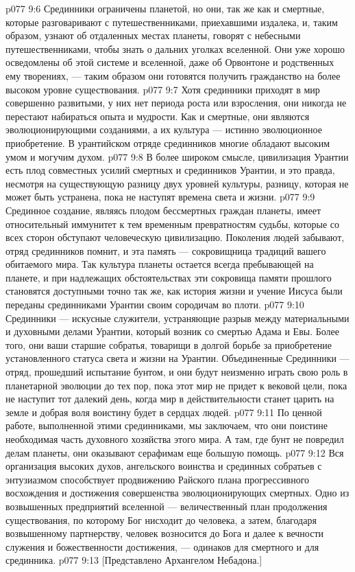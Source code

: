 \vs p077 9:6 \pc Срединники ограничены планетой, но они, так же как и смертные, которые разговаривают с путешественниками, приехавшими издалека, и, таким образом, узнают об отдаленных местах планеты, говорят с небесными путешественниками, чтобы знать о дальних уголках вселенной. Они уже хорошо осведомлены об этой системе и вселенной, даже об Орвонтоне и родственных ему творениях, --- таким образом они готовятся получить гражданство на более высоком уровне существования.
\vs p077 9:7 Хотя срединники приходят в мир совершенно развитыми, у них нет периода роста или взросления, они никогда не перестают набираться опыта и мудрости. Как и смертные, они являются эволюционирующими созданиями, а их культура --- истинно эволюционное приобретение. В урантийском отряде срединников многие обладают высоким умом и могучим духом.
\vs p077 9:8 В более широком смысле, цивилизация Урантии есть плод совместных усилий смертных и срединников Урантии, и это правда, несмотря на существующую разницу двух уровней культуры, разницу, которая не может быть устранена, пока не наступят времена света и жизни.
\vs p077 9:9 Срединное создание, являясь плодом бессмертных граждан планеты, имеет относительный иммунитет к тем временным превратностям судьбы, которые со всех сторон обступают человеческую цивилизацию. Поколения людей забывают, отряд срединников помнит, и эта память --- сокровищница традиций вашего обитаемого мира. Так культура планеты остается всегда пребывающей на планете, и при надлежащих обстоятельствах эти сокровища памяти прошлого становятся доступными точно так же, как история жизни и учение Иисуса были переданы срединниками Урантии своим сородичам во плоти.
\vs p077 9:10 Срединники --- искусные служители, устраняющие разрыв между материальными и духовными делами Урантии, который возник со смертью Адама и Евы. Более того, они ваши старшие собратья, товарищи в долгой борьбе за приобретение установленного статуса света и жизни на Урантии. Объединенные Срединники --- отряд, прошедший испытание бунтом, и они будут неизменно играть свою роль в планетарной эволюции до тех пор, пока этот мир не придет к вековой цели, пока не наступит тот далекий день, когда мир в действительности станет царить на земле и добрая воля воистину будет в сердцах людей.
\vs p077 9:11 По ценной работе, выполненной этими срединниками, мы заключаем, что они поистине необходимая часть духовного хозяйства этого мира. А там, где бунт не повредил делам планеты, они оказывают серафимам еще большую помощь.
\vs p077 9:12 \pc Вся организация высоких духов, ангельского воинства и срединных собратьев с энтузиазмом способствует продвижению Райского плана прогрессивного восхождения и достижения совершенства эволюционирующих смертных. Одно из возвышенных предприятий вселенной --- величественный план продолжения существования, по которому Бог нисходит до человека, а затем, благодаря возвышенному партнерству, человек возносится до Бога и далее к вечности служения и божественности достижения, --- одинаков для смертного и для срединника.
\vsetoff
\vs p077 9:13 [Представлено Архангелом Небадона.]
